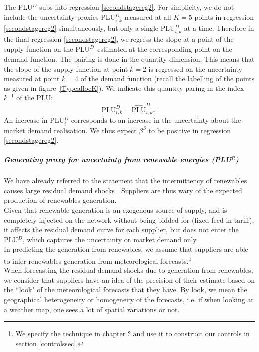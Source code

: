 The PLU$^{D}$ subs into regression \ref{secondstagereg2}. 
For simplicity, we do not include the uncertainty proxies PLU$^D_{i,k}$ measured at all $K=5$ points in regression \ref{secondstagereg2} simultaneously, but only a single PLU$^D_{i,k}$ at a time. 
Therefore in the final regression \ref{secondstagereg2}, we regress the slope at a point of the supply function on the PLU$^D_{.,.}$ estimated at the corresponding point on the demand function. The pairing is done in the quantity dimension. This means that the slope of the supply function at point $k=2$ is regressed on the uncertainty measured at point $k=4$ of the demand function (recall the labelling of the points as given in figure~\ref{TypeallocK}). We indicate this quantity paring in the index $k^{-1}$ of the PLU:
\begin{equation}
\label{levelproxy}
\text{PLU}^D_{i,k} = 
\widehat{\text{PLU}}^D_{i,k^{-1}} 
\end{equation}
An increase in PLU$^D_i$ corresponds to an increase in the uncertainty about the market demand realisation. We thus expect $\beta^S$ to be positive in regression \ref{secondstagereg2}.


\subparagraph{Generating proxy for uncertainty from renewable energies (PLU$^R$)}
\label{proxyautocorrel}

We have already referred to the statement that the intermittency of renewables causes large residual demand shocks \cite{epexwebsite1}. Suppliers are thus wary of the expected production of renewables generation. \\

Given that renewable generation is an exogenous source of supply, and is completely injected on the network without being bidded for (fixed feed-in tariff), it affects the residual demand curve for each supplier, but does not enter the PLU$^D$, which captures the uncertainty on market demand only. \\

In predicting the generation from renewables, we assume that suppliers are able to infer renewables generation from meteorological forecasts.\footnote{We specify the technique in chapter 2 and use it to construct our controls in section \ref{controlssec}.}\\

When forecasting the residual demand shocks due to generation from renewables, we consider that suppliers have an idea of the precision of their estimate based on the ``look" of the meteorological forecasts that they have. By look, we mean the geographical heterogeneity or homogeneity of the forecasts, i.e. if when looking at a weather map, one sees a lot of spatial variations or not. \\

